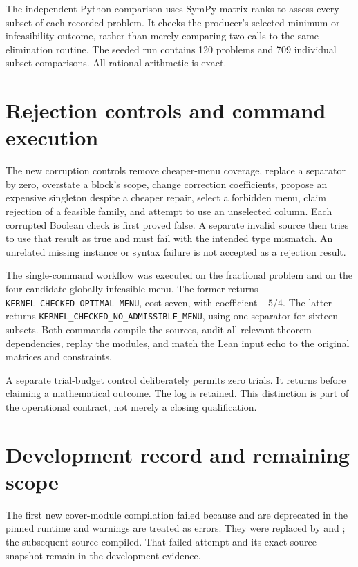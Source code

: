 \documentclass[11pt,letterpaper,oneside,openany]{book}
\theoremstyle{quiet}
\newcommand{\code}[1]{\texttt{\detokenize{#1}}}
\begin{document}
The independent Python comparison uses SymPy matrix ranks to assess every subset of each recorded problem. It checks the producer's selected minimum or infeasibility outcome, rather than merely comparing two calls to the same elimination routine. The seeded run contains 120 problems and 709 individual subset comparisons. All rational arithmetic is exact.

\section{Rejection controls and command execution}

The new corruption controls remove cheaper-menu coverage, replace a separator by zero, overstate a block's scope, change correction coefficients, propose an expensive singleton despite a cheaper repair, select a forbidden menu, claim rejection of a feasible family, and attempt to use an unselected column. Each corrupted Boolean check is first proved false. A separate invalid source then tries to use that result as true and must fail with the intended type mismatch. An unrelated missing instance or syntax failure is not accepted as a rejection result.

The single-command workflow was executed on the fractional problem and on the four-candidate globally infeasible menu. The former returns \nolinkurl{KERNEL_CHECKED_OPTIMAL_MENU}, cost seven, with coefficient $-5/4$. The latter returns \nolinkurl{KERNEL_CHECKED_NO_ADMISSIBLE_MENU}, using one separator for sixteen subsets. Both commands compile the sources, audit all relevant theorem dependencies, replay the modules, and match the Lean input echo to the original matrices and constraints.

A separate trial-budget control deliberately permits zero trials. It returns \code{UNRESOLVED} before claiming a mathematical outcome. The log is retained. This distinction is part of the operational contract, not merely a closing qualification.

\section{Development record and remaining scope}

The first new cover-module compilation failed because \code{if_true} and \code{if_false} are deprecated in the pinned runtime and warnings are treated as errors. They were replaced by \code{ite_true} and \code{ite_false}; the subsequent source compiled. That failed attempt and its exact source snapshot remain in the development evidence.
\end{document}
